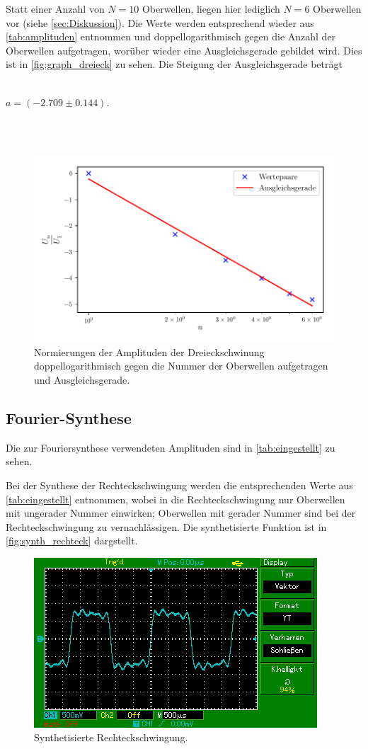 Statt einer Anzahl von $N = 10$ Oberwellen, liegen hier lediglich $N = 6$ Oberwellen vor (siehe \autoref{sec:Diskussion}).
Die Werte werden entsprechend wieder aus \autoref{tab:amplituden} entnommen und doppellogarithmisch gegen die Anzahl der 
Oberwellen aufgetragen, worüber wieder eine Ausgleichsgerade gebildet wird. Dies ist in \autoref{fig:graph_dreieck} zu sehen.
Die Steigung der Ausgleichsgerade beträgt 
\\ \\
\centerline{$a = ( -2.709 \pm 0.144 )$.}
\\ \\
\begin{figure}
  \centering
  \includegraphics{build/dreieck.pdf}
  \caption{Normierungen der Amplituden der Dreieckschwinung doppellogarithmisch gegen die Nummer der Oberwellen aufgetragen und Ausgleichsgerade.}
  \label{fig:graph_dreieck}
\end{figure}
\newpage
\subsection{Fourier-Synthese}
Die zur Fouriersynthese verwendeten Amplituden sind in \autoref{tab:eingestellt} zu sehen. 

Bei der Synthese der Rechteckschwingung werden die entsprechenden Werte aus \autoref{tab:eingestellt} entnommen, wobei in die 
Rechteckschwingung nur Oberwellen mit ungerader Nummer einwirken; Oberwellen mit gerader Nummer sind bei der Rechteckschwingung
zu vernachlässigen. Die synthetisierte Funktion ist in \autoref{fig:synth_rechteck} dargstellt.
\begin{figure}
  \centering
  \includegraphics{content/MAP002.png}
  \caption{Synthetisierte Rechteckschwingung.}
  \label{fig:synth_rechteck}
\end{figure}

